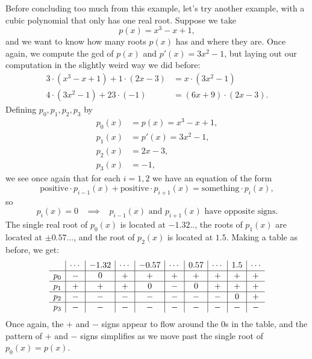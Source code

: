Before concluding too much from this example, let's try another example, with a cubic polynomial that only has one real root. Suppose we take
\[
p(x) = x^3 - x + 1,
\]
and we want to know how many roots $p(x)$ has and where they are. Once again, we compute the gcd of $p(x)$ and $p'(x) = 3x^2 - 1$, but laying out our computation in the slightly weird way we did before:
\begin{align*}
3\cdot(x^3 - x + 1) + 1\cdot(2x-3) &= x\cdot(3x^2 - 1)\\
4\cdot(3x^2-1) + 23\cdot (-1) &= (6x+9)\cdot(2x-3).
\end{align*}
Defining $p_0, p_1, p_2, p_3$ by
\begin{align*}
p_0(x) &= p(x) = x^3 - x + 1,\\
p_1(x) &= p'(x) = 3x^2 - 1,\\
p_2(x) &= 2x - 3,\\
p_3(x) &= -1,
\end{align*}
we see once again that for each $i = 1,2$ we have an equation of the form
\[
\text{positive}\cdot p_{i-1}(x) + \text{positive}\cdot p_{i+1}(x) = \text{something}\cdot p_i(x),
\]
so
\[
p_i(x) = 0 \;\;\; \implies \;\;\; p_{i-1}(x) \text{ and } p_{i+1}(x) \text{ have opposite signs.}
\]
The single real root of $p_0(x)$ is located at $-1.32..$, the roots of $p_1(x)$ are located at $\pm 0.57...$, and the root of $p_2(x)$ is located at $1.5$. Making a table as before, we get:
\[
\begin{array}{c | c | c | c | c | c | c | c | c | c}
& \cdots & -1.32 & \cdots & -0.57 & \cdots & 0.57 & \cdots & 1.5 & \cdots\\
\hline
p_0 & - & 0 & + & + & + & + & + & + & +\\
\hline
p_1 & + & + & + & 0 & - & 0 & + & + & +\\
\hline
p_2 & - & - & - & - & - & - & - & 0 & +\\
\hline
p_3 & - & - & - & - & - & - & - & - & -
\end{array}
\]
Once again, the $+$ and $-$ signs appear to flow around the $0$s in the table, and the pattern of $+$ and $-$ signs simplifies as we move past the single root of $p_0(x) = p(x)$.

